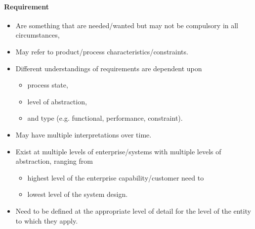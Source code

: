 \documentclass[letterpaper,10pt,english]{jupyterBook}
\begin{document}
\paragraph{Requirement}
\label{\detokenize{SE/sebok:requirement}}\begin{itemize}
\item {} 
\sphinxAtStartPar
Are something that are needed/wanted but may not be compulsory in all circumstances,

\item {} 
\sphinxAtStartPar
May refer to product/process characteristics/constraints.

\item {} 
\sphinxAtStartPar
Different understandings of requirements are dependent upon
\begin{itemize}
\item {} 
\sphinxAtStartPar
process state,

\item {} 
\sphinxAtStartPar
level of abstraction,

\item {} 
\sphinxAtStartPar
and type (e.g. functional, performance, constraint).

\end{itemize}

\item {} 
\sphinxAtStartPar
May have multiple interpretations over time.

\item {} 
\sphinxAtStartPar
Exist at multiple levels of enterprise/systems with multiple levels of abstraction, ranging from
\begin{itemize}
\item {} 
\sphinxAtStartPar
highest level of the enterprise capability/customer need to

\item {} 
\sphinxAtStartPar
lowest level of the system design.

\end{itemize}

\item {} 
\sphinxAtStartPar
Need to be defined at the appropriate level of detail for the level of the entity to which they apply.

\end{itemize}
\end{document}
